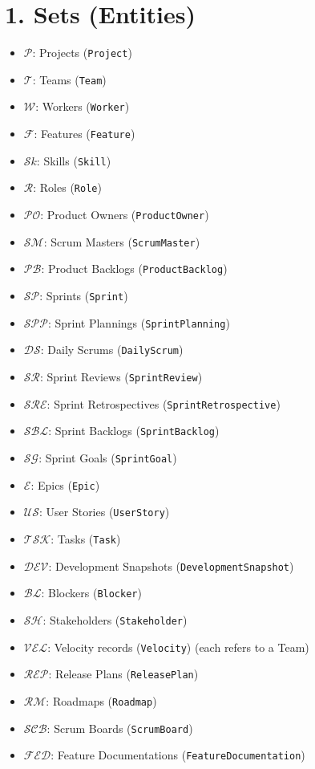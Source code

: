 \documentclass[11pt,a4paper]{article}
\begin{document}
\section{1. Sets (Entities)}
\begin{itemize}[leftmargin=2.2em]
  \item $\mathcal{P}$: Projects (\texttt{Project})
  \item $\mathcal{T}$: Teams (\texttt{Team})
  \item $\mathcal{W}$: Workers (\texttt{Worker})
  \item $\mathcal{F}$: Features (\texttt{Feature})
  \item $\mathcal{S}\!k$: Skills (\texttt{Skill})
  \item $\mathcal{R}$: Roles (\texttt{Role})
  \item $\mathcal{PO}$: Product Owners (\texttt{ProductOwner})
  \item $\mathcal{SM}$: Scrum Masters (\texttt{ScrumMaster})
  \item $\mathcal{PB}$: Product Backlogs (\texttt{ProductBacklog})
  \item $\mathcal{SP}$: Sprints (\texttt{Sprint})
  \item $\mathcal{SPP}$: Sprint Plannings (\texttt{SprintPlanning})
  \item $\mathcal{DS}$: Daily Scrums (\texttt{DailyScrum})
  \item $\mathcal{SR}$: Sprint Reviews (\texttt{SprintReview})
  \item $\mathcal{SRE}$: Sprint Retrospectives (\texttt{SprintRetrospective})
  \item $\mathcal{SBL}$: Sprint Backlogs (\texttt{SprintBacklog})
  \item $\mathcal{SG}$: Sprint Goals (\texttt{SprintGoal})
  \item $\mathcal{E}$: Epics (\texttt{Epic})
  \item $\mathcal{US}$: User Stories (\texttt{UserStory})
  \item $\mathcal{TSK}$: Tasks (\texttt{Task})
  \item $\mathcal{DEV}$: Development Snapshots (\texttt{DevelopmentSnapshot})
  \item $\mathcal{BL}$: Blockers (\texttt{Blocker})
  \item $\mathcal{SH}$: Stakeholders (\texttt{Stakeholder})
  \item $\mathcal{VEL}$: Velocity records (\texttt{Velocity}) (each refers to a Team)
  \item $\mathcal{REP}$: Release Plans (\texttt{ReleasePlan})
  \item $\mathcal{RM}$: Roadmaps (\texttt{Roadmap})
  \item $\mathcal{SCB}$: Scrum Boards (\texttt{ScrumBoard})
  \item $\mathcal{FED}$: Feature Documentations (\texttt{FeatureDocumentation})
\end{itemize}
\end{document}
